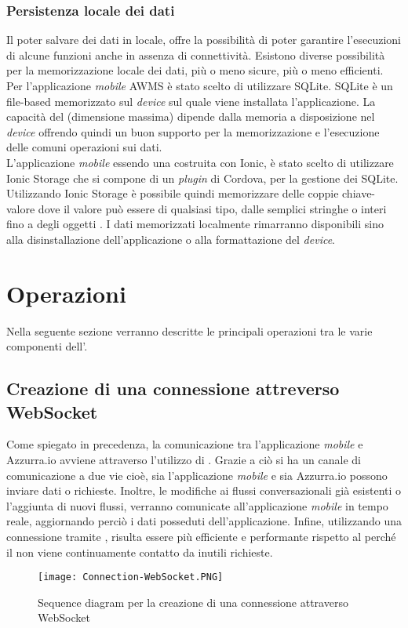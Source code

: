 \subsubsection{Persistenza locale dei dati}
Il poter salvare dei dati in locale, offre la possibilità di poter garantire l'esecuzioni di alcune funzioni anche in assenza di connettività. Esistono diverse possibilità per la memorizzazione locale dei dati, più o meno sicure, più o meno efficienti.\\

Per l'applicazione \emph{mobile} \gls{AWMS} è stato scelto di utilizzare SQLite. SQLite è un  file-based memorizzato sul \emph{device} sul quale viene installata l'applicazione. La capacità del  (dimensione massima) dipende dalla memoria a disposizione nel \emph{device} offrendo quindi un buon supporto per la memorizzazione e l'esecuzione delle comuni operazioni sui dati.\\

L'applicazione \emph{mobile} essendo una  costruita con Ionic, è stato scelto di utilizzare Ionic Storage che si compone di un \emph{plugin} di Cordova, per la gestione dei  SQLite.\\

Utilizzando Ionic Storage è possibile quindi memorizzare delle coppie chiave-valore dove il valore può essere di qualsiasi tipo,
dalle semplici stringhe o interi fino a degli oggetti . I dati memorizzati localmente rimarranno disponibili sino alla disinstallazione dell'applicazione o alla formattazione del \emph{device}.


\section{Operazioni}
Nella seguente sezione verranno descritte le principali operazioni tra le varie componenti dell'.
\subsection{Creazione di una connessione attreverso WebSocket}
Come spiegato in precedenza, la comunicazione tra l'applicazione \emph{mobile} e Azzurra.io avviene attraverso l'utilizzo di . Grazie a ciò si ha un canale di comunicazione a due vie cioè, sia l'applicazione \emph{mobile} e sia Azzurra.io possono inviare dati o richieste. Inoltre, le modifiche ai flussi conversazionali già esistenti o l'aggiunta di nuovi flussi, verranno comunicate all'applicazione \emph{mobile} in tempo reale, aggiornando perciò i dati posseduti dell'applicazione. Infine, utilizzando una connessione tramite , risulta essere più efficiente e performante rispetto al  perché il  non viene continuamente contatto da inutili richieste.
\begin{figure}[h]
	\begin{center}
		\texttt{[image: Connection-WebSocket.PNG]}
		\caption{Sequence diagram per la creazione di una connessione attraverso WebSocket}\label{fig:websocket}
	\end{center}
\end{figure}

